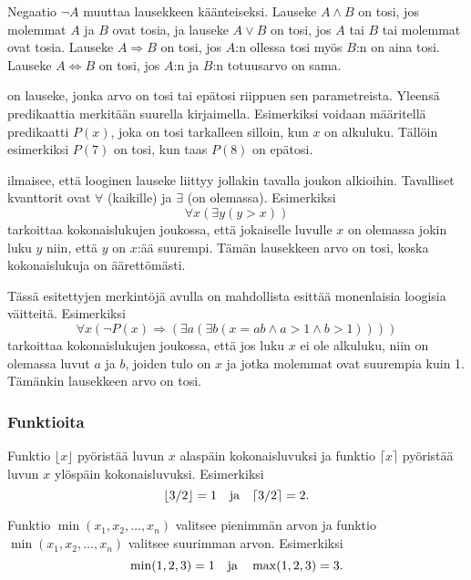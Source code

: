 Negaatio $\lnot A$ muuttaa lausekkeen käänteiseksi.
Lauseke $A \land B$ on tosi, jos molemmat $A$ ja $B$ ovat tosia,
ja lauseke $A \lor B$ on tosi, jos $A$ tai $B$ tai molemmat
ovat tosia.
Lauseke $A \Rightarrow B$ on tosi,
jos $A$:n ollessa tosi myös $B$:n on aina tosi.
Lauseke $A \Leftrightarrow B$ on tosi,
jos $A$:n ja $B$:n totuusarvo on sama.


 on lauseke, jonka arvo on tosi tai epätosi
riippuen sen parametreista.
Yleensä predikaattia merkitään suurella kirjaimella.
Esimerkiksi voidaan määritellä predikaatti $P(x)$,
joka on tosi tarkalleen silloin, kun $x$ on alkuluku.
Tällöin esimerkiksi $P(7)$ on tosi, kun taas $P(8)$ on epätosi.


 ilmaisee, että looginen
lauseke liittyy jollakin tavalla joukon alkioihin.
Tavalliset kvanttorit
ovat $\forall$ (kaikille) ja $\exists$ (on olemassa).
Esimerkiksi
\[\forall x (\exists y (y > x))\]
tarkoittaa kokonaislukujen joukossa,
että jokaiselle luvulle $x$ on olemassa
jokin luku $y$ niin, että $y$ on $x$:ää suurempi.
Tämän lausekkeen arvo on tosi, koska kokonaislukuja
on äärettömästi.

Tässä esitettyjen merkintöjä avulla on mahdollista esittää
monenlaisia loogisia väitteitä.
Esimerkiksi
\[\forall x (\lnot P(x) \Rightarrow (\exists a (\exists b (x = ab \land a > 1 \land b > 1))))\]
tarkoittaa kokonaislukujen joukossa, että jos luku $x$ ei ole alkuluku,
niin on olemassa luvut $a$ ja $b$,
joiden tulo on $x$ ja jotka molemmat ovat suurempia kuin 1.
Tämänkin lausekkeen arvo on tosi.


\subsubsection{Funktioita}

Funktio $\lfloor x \rfloor$ pyöristää luvun $x$
alaspäin kokonaisluvuksi ja
funktio $\lceil x \rceil$ pyöristää luvun $x$
ylöspäin kokonaisluvuksi. Esimerkiksi
\[ \lfloor 3/2 \rfloor = 1 \hspace{10px} \textrm{ja} \hspace{10px} \lceil 3/2 \rceil = 2.\]

Funktio $\min(x_1,x_2,\ldots,x_n)$ valitsee pienimmän arvon
ja
funktio $\min(x_1,x_2,\ldots,x_n)$ valitsee suurimman arvon.
Esimerkiksi
\[ \min(1,2,3)=1 \hspace{10px} \textrm{ja} \hspace{10px} \max(1,2,3)=3.\]

